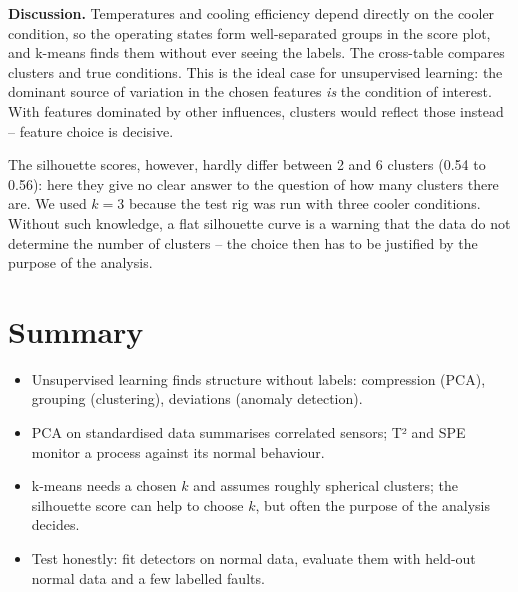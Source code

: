 \documentclass[
  letterpaper,
  DIV=11,
  numbers=noendperiod]{scrreprt}
\providecommand{\tightlist}{%
  \setlength{\itemsep}{0pt}\setlength{\parskip}{0pt}}\usepackage{longtable,booktabs,array}
\begin{document}
\textbf{Discussion.} Temperatures and cooling efficiency depend directly
on the cooler condition, so the operating states form well-separated
groups in the score plot, and k-means finds them without ever seeing the
labels. The cross-table compares clusters and true conditions. This is
the ideal case for unsupervised learning: the dominant source of
variation in the chosen features \emph{is} the condition of interest.
With features dominated by other influences, clusters would reflect
those instead -- feature choice is decisive.

The silhouette scores, however, hardly differ between 2 and 6 clusters
(0.54 to 0.56): here they give no clear answer to the question of how
many clusters there are. We used \(k = 3\) because the test rig was run
with three cooler conditions. Without such knowledge, a flat silhouette
curve is a warning that the data do not determine the number of clusters
-- the choice then has to be justified by the purpose of the analysis.

\section{Summary}\label{summary-9}

\begin{tcolorbox}[enhanced jigsaw, left=2mm, title=\textcolor{quarto-callout-important-color}{\faExclamation}\hspace{0.5em}{Key takeaways}, opacityback=0, breakable, rightrule=.15mm, arc=.35mm, toptitle=1mm, colbacktitle=quarto-callout-important-color!10!white, opacitybacktitle=0.6, coltitle=black, colframe=quarto-callout-important-color-frame, bottomrule=.15mm, leftrule=.75mm, bottomtitle=1mm, titlerule=0mm, toprule=.15mm, colback=white]

\begin{itemize}
\tightlist
\item
  Unsupervised learning finds structure without labels: compression
  (PCA), grouping (clustering), deviations (anomaly detection).
\item
  PCA on standardised data summarises correlated sensors; T² and SPE
  monitor a process against its normal behaviour.
\item
  k-means needs a chosen \(k\) and assumes roughly spherical clusters;
  the silhouette score can help to choose \(k\), but often the purpose
  of the analysis decides.
\item
  Test honestly: fit detectors on normal data, evaluate them with
  held-out normal data and a few labelled faults.
\end{itemize}

\end{tcolorbox}
\end{document}
